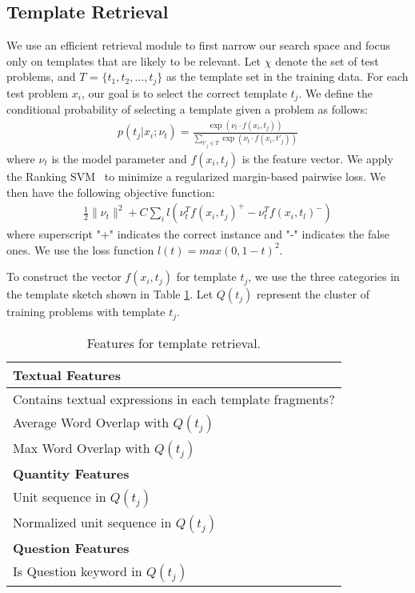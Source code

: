 \documentclass[11pt,letterpaper]{article}
\begin{document}
\subsection{Template Retrieval}
We use an efficient retrieval module to first narrow our search space and focus only on templates that are likely to be relevant. Let $\chi$ denote the set of test problems, and $T$ = $\{t_{1},t_{2},\dots,t_{j}\}$ as the template set in the training data. For each test problem $x_{i}$, our goal is to select the correct template $t_{j}$. We define the conditional probability of selecting a template given a problem as follows:
\begin{gather*}
p(t_{j}|x_{i};\nu_{t})=\frac{\exp(\nu_{t} \cdot f(x_{i},t_{j}))} {\sum_{t'_{j}\in T} \exp(\nu_{t} \cdot f(x_{i},t'_{j}))}
\end{gather*}
where $\nu_{t}$ is the model parameter and $f(x_{i},t_{j})$ is the feature vector.
We apply the Ranking SVM~\cite{herbrich2010rankingsvm} to minimize a regularized margin-based pairwise loss. We then have the following objective function:
\begin{gather*}
\frac{1}{2}\|\nu_{t}\|^2 + C \sum_{i} l(\nu_{t}^T f(x_{i},t_{j})^+-\nu_{t}^T f(x_{i},t_{l})^-)
\end{gather*}
where superscript "+" indicates the correct instance and "-" indicates the false ones. We use the loss function $l(t) = max(0, 1 - t)^2$.

To construct the vector $f(x_{i},t_{j})$ for template $t_{j}$, we use the three categories in the template sketch shown in Table \ref{tbl:templateftr}. Let $Q(t_{j})$ represent the cluster of training problems with template $t_{j}$.
\begin{table}[htb]
\begin{center}
	\begin{tabular}{|p{}|}
        \hline
        \textbf{Textual Features}\\
        \hline
        Contains textual expressions in each template fragments?\\
        Average Word Overlap with $Q(t_{j})$\\
        Max Word Overlap with $Q(t_{j})$\\
        \hline
        \hline
		\textbf{Quantity Features}\\
        \hline
        Unit sequence in $Q(t_{j})$\\
        Normalized unit sequence in $Q(t_{j})$\\
        \hline
        \hline
        \textbf{Question Features}\\
        \hline
        Is Question keyword in $Q(t_{j})$\\
		\hline
    \end{tabular}
\end{center}
\caption {Features for template retrieval.}\label{tbl:templateftr}
\end{table}
\end{document}
